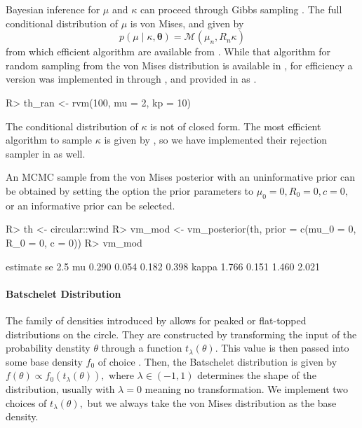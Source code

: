 Bayesian inference for \(\mu\) and \(\kappa\) can proceed through Gibbs
sampling \citep{chib1995understanding}. The full conditional
distribution of \(\mu\) is von Mises, and given by \begin{equation}
p(\mu \mid \kappa, \boldsymbol{\theta}) = \mathcal{M}(\mu_n, R_n \kappa)
\end{equation} from which efficient algorithm are available from
\citet{best1981bias}. While that algorithm for random sampling from the
von Mises distribution is available in , for efficiency a
version was implemented in  through 
\citep{rcpp}, and provided in  as .

\begin{CodeChunk}

\begin{CodeInput}
R> th_ran <- rvm(100, mu = 2, kp = 10)
\end{CodeInput}
\end{CodeChunk}

The conditional distribution of \(\kappa\) is not of closed form. The
most efficient algorithm to sample \(\kappa\) is given by
\citet{forbes2015fast}, so we have implemented their rejection sampler
in  as well.

An MCMC sample from the von Mises posterior with an uninformative prior
can be obtained by setting the option the prior parameters to
\(\mu_0 = 0, R_0 = 0, c = 0,\) or an informative prior can be selected.

\begin{CodeChunk}

\begin{CodeInput}
R> th     <- circular::wind
R> vm_mod <- vm_posterior(th, prior = c(mu_0 = 0, R_0 = 0, c = 0))
R> vm_mod
\end{CodeInput}

\begin{CodeOutput}
      estimate    se  2.5%
mu       0.290 0.054 0.182 0.398
kappa    1.766 0.151 1.460 2.021
\end{CodeOutput}
\end{CodeChunk}

\hypertarget{batschelet-distribution}{%
\paragraph{Batschelet Distribution}\label{batschelet-distribution}}

The family of densities introduced by \citet{batschelet1981circular}
allows for peaked or flat-topped distributions on the circle. They are
constructed by transforming the input of the probability denstity
\(\theta\) through a function \(t_{\lambda}(\theta).\) This value is
then passed into some base density \(f_0\) of choice
\citep{abe2010symmetric, pewsey2011extension}. Then, the Batschelet
distribution is given by \(f(\theta) \propto f_0(t_\lambda(\theta)),\)
where \(\lambda \in (-1, 1)\) determines the shape of the distribution,
usually with \(\lambda = 0\) meaning no transformation. We implement two
choices of \(t_{\lambda}(\theta),\) but we always take the von Mises
distribution as the base density.

